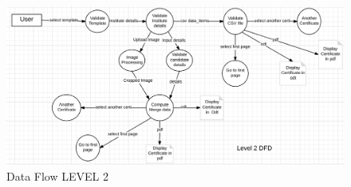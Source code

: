 \begin{figure}
\centering \includegraphics[scale=0.45]{images/cgs/dfd_2.png}
\caption{Data Flow LEVEL 2}
\label{fig:DFd}
\end{figure}

